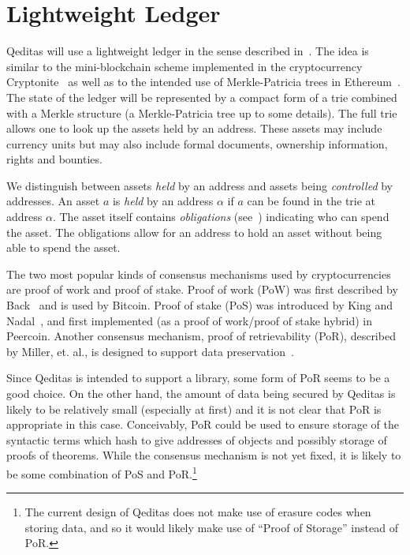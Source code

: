 \documentclass{article}
\begin{document}
\section{Lightweight Ledger}\label{sec:ledger}

Qeditas will use a lightweight ledger in the sense described in~\cite{White2015b}.
The idea is similar to the mini-blockchain scheme
implemented in the cryptocurrency Cryptonite~\cite{Bruce2014}
as well as to the intended use of Merkle-Patricia trees in Ethereum~\cite{WoodEtheriumYellow}.
The state of the ledger will be represented by a compact form of a trie
combined with a Merkle structure (a Merkle-Patricia tree up to some details).
The full trie allows one to look up the assets held by an address.
These assets may include currency units but may also include formal documents,
ownership information, rights and bounties.

We distinguish between assets {\em{held}} by an address and assets being {\em{controlled}}
by addresses. An asset $a$ is {\em{held}} by an address $\alpha$ if $a$
can be found in the trie at address $\alpha$. The asset itself contains {\em{obligations}}
(see~\cite{White2015b}) indicating who can spend the asset. The obligations allow
for an address to hold an asset without being able to spend the asset.

The two most popular kinds of consensus mechanisms used by cryptocurrencies are proof of work and proof of stake. Proof of work (PoW) was first
described by Back~\cite{Back2002}
and is used by Bitcoin.
Proof of stake (PoS) was introduced by King and Nadal~\cite{KingNadal2012}, and first implemented
(as a proof of work/proof of stake hybrid) in Peercoin.
Another consensus mechanism, proof of retrievability
(PoR), described by Miller, et. al., is designed to support data preservation~\cite{MillerJSPK14}.

Since Qeditas is intended to support a library, some form of PoR seems to be
a good choice. On the other hand, the amount of data being secured by Qeditas
is likely to be relatively small (especially at first) and it is not clear that PoR is
appropriate in this case. Conceivably, PoR could be used to ensure storage of
the syntactic terms which hash to give addresses of objects and possibly storage
of proofs of theorems. While the consensus mechanism is not yet fixed, it is
likely to be some combination of PoS and PoR.\footnote{The current design of Qeditas does not make use of erasure codes when storing data, and so it would likely make use of ``Proof of Storage'' instead of PoR.}
\end{document}
